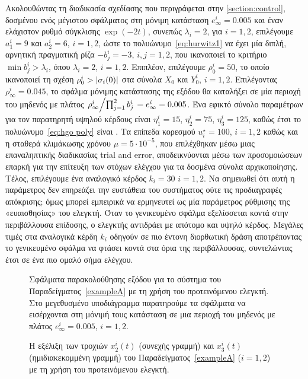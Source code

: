 Ακολουθώντας τη διαδικασία σχεδίασης που περιγράφεται στην \cref{section:control}, δοσμένου ενός μέγιστου σφάλματος στη μόνιμη κατάσταση $e_\infty^i = 0.005$ και έναν ελάχιστον ρυθμό σύγκλισης $\exp(-2 t)$, συνεπώς $\lambda_i =2$, για $i=1,2$, επιλέγουμε $a_1^i = 9$ και $a_2^i = 6$, $i=1,2$, ώστε το πολυώνυμο~\eqref{eq:hurwitz1} να έχει μία διπλή, αρνητική πραγματική ρίζα $-b_j^i = -3$, $i,j = 1,2$, που ικανοποιεί το κριτήριο $\min{b_j^i} > \lambda_i$, όπου $\lambda_i = 2$, $i = 1,2$. Επιπλέον, επιλέγουμε $\rho_0^i = 50$, το οποίο ικανοποιεί τη σχέση $\rho_0^i > \abs{\sigma_i(0)}$ στα σύνολα $X_0$ και $Y_0^i$, $i= 1,2$. Επιλέγοντας $\rho_\infty^i = 0.045$, το σφάλμα μόνιμης κατάστασης της εξόδου θα καταλήξει σε μία περιοχή του μηδενός με πλάτος  $\flatfrac{\rho_\infty^i}{\prod_{j=1}^2b_j^i} = e_\infty^i = 0.005$. Ένα εφικτό σύνολο παραμέτρων για τον παρατηρητή υψηλού κέρδους είναι $\eta_1^i = 15$, $\eta_2^i = 75$, $\eta_3^i = 125$, καθώς έτσι το πολυώνυμο~\eqref{eq:hgo poly} είναι \hur. Τα επίπεδα κορεσμού $u_i^\star = 100$, $i=1,2$ καθώς και η σταθερά κλιμάκωσης χρόνου $\mu = 5\cdot 10^{-5}$, που επιλέχθηκαν μέσω μιας επαναληπτικής διαδικασίας \textlatin{trial and error}, αποδεικνύονται μέσω των προσομοιώσεων επαρκή για την επίτευξη των στόχων ελέγχου για τα δοσμένα σύνολα αρχικοποίησης. Τέλος, επιλέγουμε ένα αναλογικό κέρδος $k_i = 30$ $i=1,2$. Να σημειωθεί ότι αυτή η παράμετρος δεν επηρεάζει την ευστάθεια του συστήματος ούτε τις προδιαγραφές απόκρισης; όμως μπορεί εμπειρικά να ερμηνευτεί ως μία παράμετρος ρύθμισης της «ευαισθησίας» του ελεγκτή. Όταν το γενικευμένο σφάλμα εξελίσσεται κοντά στην περιβάλλουσα επίδοσης, ο ελεγκτής αντιδράει με απότομο και υψηλό κέρδος. Μεγάλες τιμές στα αναλογικά κέρδη $k_i$ οδηγούν σε πιο έντονη διορθωτική δράση αποτρέποντας το γενικευμένο σφάλμα να φτάσει κοντά στα όρια της περιβάλλουσας, συντελώντας έτσι σε ένα πιο ομαλό σήμα ελέγχου.

\begin{figure}[tb]
    \centering
    
    \caption{Σφάλματα παρακολούθησης εξόδου για το σύστημα του Παραδείγματος~\ref{exampleA} με τη χρήση του προτεινόμενου ελεγκτή. Στο μεγεθυσμένο υποδιάγραμμα παρατηρούμε τα σφάλματα να εισέρχονται στη μόνιμή τους κατάσταση σε μια περιοχή του μηδενός με πλάτος $e^i_\infty = 0.005$, $i =1,2$.}
    \label{fig:exA tracking errors}
\end{figure}

\begin{figure}[tb]
    \centering
    
    \caption{Η εξέλιξη των τροχιών $x^i_2(t)$ (συνεχής γραμμή) και $x^i_3(t)$ (ημιδιακεκομμένη γραμμή) του Παραδείγματος~\ref{exampleA} ($i = 1,2$) με τη χρήση του προτεινόμενου ελεγκτή.}
    \label{fig:exA states}
\end{figure}

